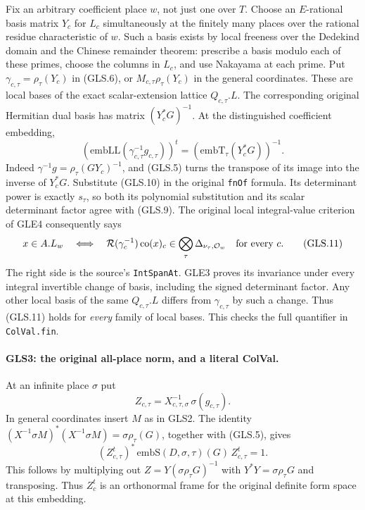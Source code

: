 Fix an arbitrary coefficient place $w$, not just one over $T$.
Choose an $E$-rational basis matrix $Y_c$ for $L_c$ simultaneously at
the finitely many places over the rational residue characteristic of
$w$.  Such a basis exists by local freeness over the Dedekind domain
and the Chinese remainder theorem: prescribe a basis modulo each of
these primes, choose the columns in $L_c$, and use Nakayama at each
prime.  Put $\gamma_{c,\tau}=\rho_\tau(Y_c)$ in (GLS.6), or
$M_{c,\tau}\rho_\tau(Y_c)$ in the general coordinates.  These are
local bases of the exact scalar-extension lattice $Q_{c,\tau}.L$.
The corresponding original Hermitian dual basis has matrix
$(Y_c^*G)^{-1}$.  At the distinguished coefficient embedding,
\[
 \left(\mathrm{embLL}
             (\gamma_{c,\tau}^{-1}g_{c,\tau})\right)^t
       =\left(\mathrm{embT}_\tau(Y_c^*G)\right)^{-1}.
 \tag{GLS.10}
\]
Indeed $\gamma^{-1}g=\rho_\tau(GY_c)^{-1}$, and (GLS.5)
turns the transpose of its image into the inverse of $Y_c^*G$.
Substitute (GLS.10) in the original \texttt{fnOf} formula.
Its determinant power is exactly $s_\tau$, so both its polynomial
substitution and its scalar determinant factor agree with (GLS.9).
The original local integral-value criterion of GLE4 consequently says
\[
 x\in A.L_w\quad\Longleftrightarrow\quad
 \mathcal R(\gamma_c^{-1})\operatorname{co}(x)_c
       \in\bigotimes_\tau\Delta_{\nu_\tau,\mathcal O_w}
       \quad\hbox{for every }c.                  \tag{GLS.11}
\]
The right side is the source's \texttt{IntSpanAt}.  GLE3 proves its
invariance under every integral invertible change of basis, including
the signed determinant factor.  Any other local basis of the same
$Q_{c,\tau}.L$ differs from $\gamma_{c,\tau}$ by such a change.
Thus (GLS.11) holds for \emph{every} family of local bases.  This
checks the full quantifier in \texttt{ColVal.fin}.

\paragraph{GLS3: the original all-place norm, and a literal ColVal.}
\label{claim:GLS3}
At an infinite place $\sigma$ put
\[
 Z_{c,\tau}=X_{c,\tau,\sigma}^{-1}\,
                         \sigma(g_{c,\tau}).
 \tag{GLS.12}
\]
In general coordinates insert $M$ as in GLS2.  The identity
$(X^{-1}\sigma M)^*(X^{-1}\sigma M)=\sigma\rho_\tau(G)$,
together with (GLS.5), gives
\[
 (Z_{c,\tau}^{t})^*\,
      \mathrm{embS}(D,\sigma,\tau)(G)\,Z_{c,\tau}^{t}=1.
 \tag{GLS.13}
\]
This follows by multiplying out $Z=Y(\sigma\rho_\tau G)^{-1}$
with $Y^*Y=\sigma\rho_\tau G$ and transposing.  Thus $Z_c^t$ is
an orthonormal frame for the original definite form space at this
embedding.

